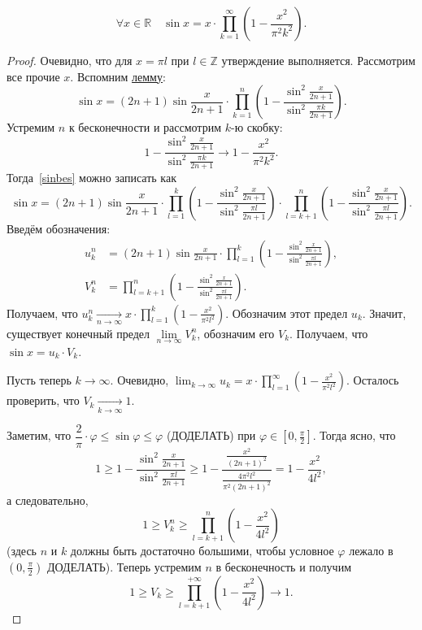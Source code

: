 \begin{theorem}
	\[
		\forall x \in \mathbb{R} \quad \sin x = x \cdot \prod_{k=1}^{\infty} \left(1 - \frac{x^2}{\pi^2 k^2} \right).
	\]
\end{theorem}
\begin{proof}
	Очевидно, что для \(x = \pi l\) при \(l \in \mathbb{Z}\) утверждение выполняется. Рассмотрим все прочие \(x\). Вспомним \hyperlink{sinlem}{лемму}:
	\begin{equation} \label{sinbes}
		\sin x = (2n + 1) \sin \frac{x}{2n + 1} \cdot \prod_{k=1}^{n} \left(1 - \frac{\sin^2 \frac{x}{2n + 1}}{\sin^2 \frac{\pi k}{2n + 1}} \right).
	\end{equation}
	Устремим \(n\) к бесконечности и рассмотрим \(k\)-ю скобку: \[
	1 - \frac{\sin^2 \frac{x}{2n + 1}}{\sin^2 \frac{\pi k}{2n + 1}} \to 1 - \frac{x^2}{\pi^2 k^2}.
	\]
	Тогда~\eqref{sinbes} можно записать как \[
	\sin x = (2n + 1) \sin \frac{x}{2n + 1} \cdot \prod_{l=1}^{k} \left(1 - \frac{\sin^2 \frac{x}{2n + 1}}{\sin^2 \frac{\pi l}{2n + 1}} \right) \cdot \prod_{l=k+1}^{n} \left(1 - \frac{\sin^2 \frac{x}{2n + 1}}{\sin^2 \frac{\pi l}{2n + 1}} \right).
	\]
	Введём обозначения:
	\begin{align*}
		u_k^n &= (2n + 1) \sin \frac{x}{2n + 1} \cdot \prod_{l=1}^{k} \left(1 - \frac{\sin^2 \frac{x}{2n + 1}}{\sin^2 \frac{\pi l}{2n + 1}} \right), \\
		V_k^n &= \prod_{l=k+1}^{n} \left(1 - \frac{\sin^2 \frac{x}{2n + 1}}{\sin^2 \frac{\pi l}{2n + 1}} \right).
	\end{align*}
	Получаем, что \(\displaystyle u_k^n \xrightarrow[n \to \infty]{} x \cdot \prod_{l=1}^{k} \left(1 - \frac{x^2}{\pi^2 l^2} \right)\). Обозначим этот предел \(u_k\). Значит, существует конечный предел \(\lim\limits_{n \to \infty} V_k^n\), обозначим его \(V_k\). Получаем, что \(\sin x = u_k \cdot V_k\).
	
	Пусть теперь \(k \to \infty\). Очевидно, \(\displaystyle \lim_{k \to \infty} u_k = x \cdot \prod_{l=1}^{\infty} \left(1 - \frac{x^2}{\pi^2 l^2} \right)\). Осталось проверить, что \(V_k \xrightarrow[k \to \infty]{} 1\).
	
	Заметим, что \(\dfrac{2}{\pi} \cdot \varphi \leqslant \sin \varphi \leqslant \varphi\) (ДОДЕЛАТЬ) при \(\varphi \in \left[0, \frac{\pi}{2} \right]\). Тогда ясно, что \[
	1 \geqslant 1 - \frac{\sin^2 \frac{x}{2n + 1}}{\sin^2 \frac{\pi l}{2n + 1}} \geqslant 1 - \frac{\frac{x^2}{(2n + 1)^2}}{\frac{4 \pi^2 l^2}{\pi^2 (2n + 1)^2}} = 1 - \frac{x^2}{4 l^2},
	\]
	а следовательно, \[
	1 \geqslant V_k^n \geqslant \prod_{l=k+1}^{n} \left(1 - \frac{x^2}{4 l^2} \right)
	\]
	(здесь \(n\) и \(k\) должны быть достаточно большими, чтобы условное \(\varphi\) лежало в \(\left(0, \frac{\pi}{2} \right)\) ДОДЕЛАТЬ).
	Теперь устремим \(n\) в бесконечность и получим \[
	1 \geqslant V_k \geqslant \prod_{l=k+1}^{+\infty} \left(1 - \frac{x^2}{4 l^2} \right) \to 1.
	\]
\end{proof}

